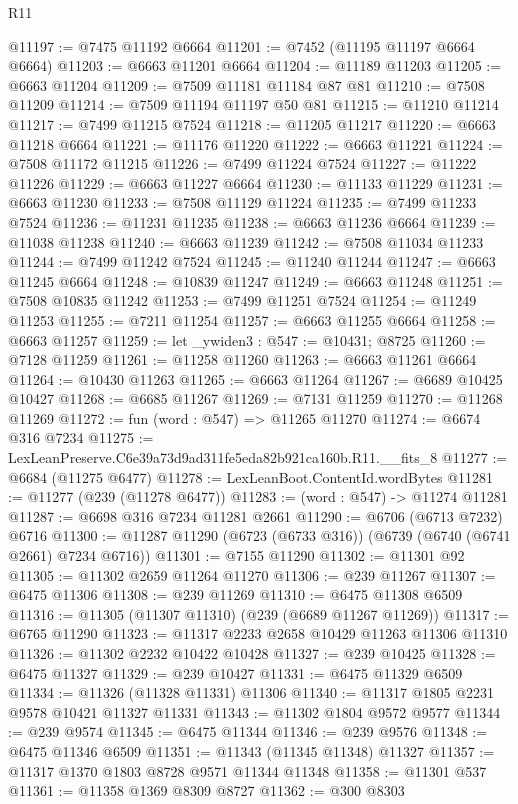 \begin{lexlean}{R11}
\begin{coremodule}
@11197 := @7475 @11192 @6664
@11201 := @7452 (@11195 @11197 @6664 @6664)
@11203 := @6663 @11201 @6664
@11204 := @11189 @11203
@11205 := @6663 @11204
@11209 := @7509 @11181 @11184 @87 @81
@11210 := @7508 @11209
@11214 := @7509 @11194 @11197 @50 @81
@11215 := @11210 @11214
@11217 := @7499 @11215 @7524
@11218 := @11205 @11217
@11220 := @6663 @11218 @6664
@11221 := @11176 @11220
@11222 := @6663 @11221
@11224 := @7508 @11172 @11215
@11226 := @7499 @11224 @7524
@11227 := @11222 @11226
@11229 := @6663 @11227 @6664
@11230 := @11133 @11229
@11231 := @6663 @11230
@11233 := @7508 @11129 @11224
@11235 := @7499 @11233 @7524
@11236 := @11231 @11235
@11238 := @6663 @11236 @6664
@11239 := @11038 @11238
@11240 := @6663 @11239
@11242 := @7508 @11034 @11233
@11244 := @7499 @11242 @7524
@11245 := @11240 @11244
@11247 := @6663 @11245 @6664
@11248 := @10839 @11247
@11249 := @6663 @11248
@11251 := @7508 @10835 @11242
@11253 := @7499 @11251 @7524
@11254 := @11249 @11253
@11255 := @7211 @11254
@11257 := @6663 @11255 @6664
@11258 := @6663 @11257
@11259 := let _ywiden3 : @547 := @10431; @8725
@11260 := @7128 @11259
@11261 := @11258 @11260
@11263 := @6663 @11261 @6664
@11264 := @10430 @11263
@11265 := @6663 @11264
@11267 := @6689 @10425 @10427
@11268 := @6685 @11267
@11269 := @7131 @11259
@11270 := @11268 @11269
@11272 := fun (word : @547) => @11265 @11270
@11274 := @6674 @316 @7234
@11275 := LexLeanPreserve.C6e39a73d9ad311fe5eda82b921ca160b.R11.__fits_8
@11277 := @6684 (@11275 @6477)
@11278 := LexLeanBoot.ContentId.wordBytes
@11281 := @11277 (@239 (@11278 @6477))
@11283 := (word : @547) -> @11274 @11281
@11287 := @6698 @316 @7234 @11281 @2661
@11290 := @6706 (@6713 @7232) @6716
@11300 := @11287 @11290 (@6723 (@6733 @316)) (@6739 (@6740 (@6741 @2661) @7234 @6716))
@11301 := @7155 @11290
@11302 := @11301 @92
@11305 := @11302 @2659 @11264 @11270
@11306 := @239 @11267
@11307 := @6475 @11306
@11308 := @239 @11269
@11310 := @6475 @11308 @6509
@11316 := @11305 (@11307 @11310) (@239 (@6689 @11267 @11269))
@11317 := @6765 @11290
@11323 := @11317 @2233 @2658 @10429 @11263 @11306 @11310
@11326 := @11302 @2232 @10422 @10428
@11327 := @239 @10425
@11328 := @6475 @11327
@11329 := @239 @10427
@11331 := @6475 @11329 @6509
@11334 := @11326 (@11328 @11331) @11306
@11340 := @11317 @1805 @2231 @9578 @10421 @11327 @11331
@11343 := @11302 @1804 @9572 @9577
@11344 := @239 @9574
@11345 := @6475 @11344
@11346 := @239 @9576
@11348 := @6475 @11346 @6509
@11351 := @11343 (@11345 @11348) @11327
@11357 := @11317 @1370 @1803 @8728 @9571 @11344 @11348
@11358 := @11301 @537
@11361 := @11358 @1369 @8309 @8727
@11362 := @300 @8303

\end{coremodule}
\end{lexlean}
